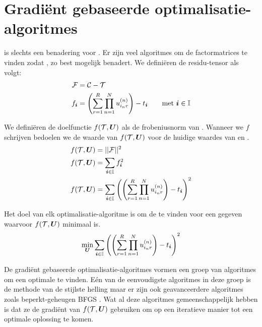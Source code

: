 
\section{Gradi\"ent gebaseerde optimalisatie-algoritmes}
\label{h:algo} 

\TT{} is slechts een benadering voor \CC{}. Er zijn veel algoritmes om de factormatrices te vinden zodat \CC{}, \TT{} zo best mogelijk benadert. We defini\"eren de residu-tensor \FF{} als volgt:
\begin{align*}
    \mathcal{F} &= \mathcal{C} - \mathcal{T}\\
    f_{\boldsymbol{i}{}} &= \left( \sum_{r=1}^{R} \prod_{n=1}^{N} u^{(n)}_{i_{n}r} \right) - t_{\boldsymbol{i}{}} \qquad \text{met $\boldsymbol{i}{} \in \mathbb{I}$}\\
\end{align*}

We defini\"eren de doelfunctie $f(\mathcal{T}, \boldsymbol{U})$ als de frobeniusnorm van \FF{}. Wanneer we $f$ schrijven bedoelen we %
de waarde van $f(\mathcal{T}, \boldsymbol{U})$ voor de huidige waardes van \TT{} en \UUU{}.
\begin{align*}
    f(\mathcal{T}, \boldsymbol{U}) &= ||\mathcal{F}||^2\\
    f(\mathcal{T}, \boldsymbol{U}) &= \sum_{\boldsymbol{i}{} \in \mathbb{I}} f_{\boldsymbol{i}{}}^2\\
    f(\mathcal{T}, \boldsymbol{U}) &=  \sum_{\boldsymbol{i}{} \in \mathbb{I}} \left( \left( \sum_{r=1}^{R} \prod_{n=1}^{N} u^{(n)}_{i_{n}r} \right) - t_{\boldsymbol{i}{}} \right)^2
\end{align*}

Het doel van elk optimalisatie-algoritme is om de \UUU{} te vinden voor een gegeven \TT{} waarvoor $f(\mathcal{T}, \boldsymbol{U})$ minimaal is.
\[
    \min_{\boldsymbol{U}} \sum_{\boldsymbol{i}{} \in \mathbb{I}} \left( \left( \sum_{r=1}^{R} \prod_{n=1}^{N} u^{(n)}_{i_{n}r} \right) - t_{\boldsymbol{i}{}} \right)^2
\]

De gradi\"ent gebaseerde optimalisatie-algoritmes vormen een groep van algoritmes om een optimale \UUU{} te vinden. E\'en van de eenvoudigste algoritmes in deze groep is de methode van de stijlste helling maar er zijn ook geavanceerdere algoritmes zoals beperkt-geheugen BFGS \cite{bfgs}. Wat al deze algoritmes gemeenschappelijk hebben is dat ze de gradi\"ent van $f(\mathcal{T}, \boldsymbol{U})$ gebruiken om op een iteratieve manier tot een optimale oplossing te komen.

